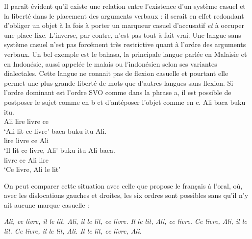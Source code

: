 {    \ea
    \z

    Il paraît évident qu’il existe une relation entre l’existence d’un système casuel et la liberté dans le placement des arguments verbaux : il serait en effet redondant d’obliger un objet à la fois à porter un marqueur casuel d’accusatif \textit{et} à occuper une place fixe. L’inverse, par contre, n’est pas tout à fait vrai. Une langue sans système casuel n’est pas forcément très restrictive quant à l’ordre des arguments verbaux. Un bel exemple est le bahasa, la principale langue parlée en Malaisie et en Indonésie, aussi appelée le malais ou l’indonésien selon ses variantes dialectales. Cette langue ne connait pas de flexion casuelle et pourtant elle permet une plus grande liberté de mots que d’autres langues sans flexion. Si l’ordre dominant est l’ordre SVO comme dans la phrase a, il est possible de postposer le sujet comme en b et d’antéposer l’objet comme en c.
    \ea
    \ea
    \gll Ali baca buku itu.\\
    Ali lire    livre  ce\\
    \glt  ‘Ali lit ce livre’
    \ex
    \gll baca buku itu Ali.\\
    lire    livre  ce Ali\\
    \glt  ‘Il lit ce livre, Ali’
    \ex
    \gll buku itu Ali baca.\\
        livre ce Ali lire    \\
    \glt  ‘Ce livre, Ali le lit’
    \z
    \z

    On peut comparer cette situation avec celle que propose le français à l’oral, où, avec les dislocations gauches et droites, les six ordres sont possibles sans qu’il n’y ait aucune marque casuelle :

    \ea
    \ea\itshape {Ali, ce livre, il le lit.}
    \ex\itshape {Ali, il le lit, ce livre.}
    \ex\itshape {Il le lit, Ali, ce livre.}
    \ex\itshape {Ce livre, Ali, il le lit.}
    \ex\itshape {Ce livre, il le lit, Ali.}
    \ex\itshape {Il le lit, ce livre, Ali.}
    \z
    \z
}
